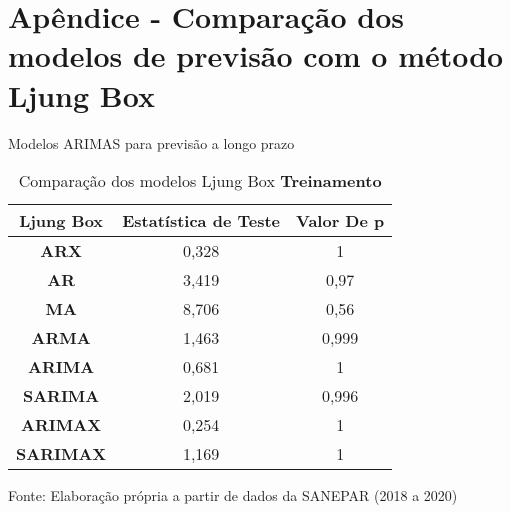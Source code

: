 
\section{Ap\^endice - Compara\c c\~ao dos modelos de previs\~ao com o m\'etodo Ljung Box}\label{sec:comtb18}



Modelos ARIMAS para previsão a longo prazo

	\begin{table}[H]
		\centering
		\caption{Comparação dos modelos Ljung Box \textbf{Treinamento} }\label{tb:lbtrn}
	\begin{tabular}{@{}ccc@{}}
		\toprule
		\textbf{Ljung Box} & \textbf{Estatística de Teste} & \textbf{Valor De p} \\ \midrule
		\textbf{ARX}       & 0,328                         & 1                   \\
		\textbf{AR}        & 3,419                         & 0,97                \\
		\textbf{MA}        & 8,706                         & 0,56                \\
		\textbf{ARMA}      & 1,463                         & 0,999               \\
		\textbf{ARIMA}     & 0,681                         & 1                   \\
		\textbf{SARIMA}    & 2,019                         & 0,996               \\
		\textbf{ARIMAX}    & 0,254                         & 1                   \\
		\textbf{SARIMAX}   & 1,169                         & 1                   \\ \bottomrule
	\end{tabular}

Fonte: Elaboração própria a partir de dados da SANEPAR (2018 a 2020)
	\end{table}

